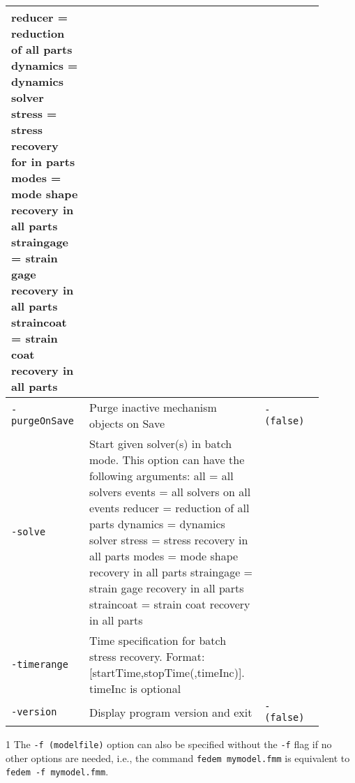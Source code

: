 \begin{threeparttable}[b]
\begin{tabular}{|>{\raggedright} p{0.23\linewidth}| p{0.48\linewidth}| p{0.18\linewidth}|}
                              reducer = reduction of all parts\newline
                              dynamics = dynamics solver\newline
                              stress = stress recovery for in parts\newline
                              modes = mode shape recovery in all parts\newline
                              straingage = strain gage recovery in all parts\newline
                              straincoat = strain coat recovery in all parts   & \\
  \hline
  \texttt{-purgeOnSave}  &   Purge inactive mechanism objects on Save & \texttt{- (false)} \\
  \hline
  \texttt{-solve}  &   Start given solver(s) in batch mode. This option can have the following arguments:\newline
                       all = all solvers\newline
                       events = all solvers on all events\newline
                       reducer = reduction of all parts\newline
                       dynamics = dynamics solver\newline
                       stress = stress recovery in all parts\newline
                       modes = mode shape recovery in all parts\newline
                       straingage = strain gage recovery in all parts\newline
                       straincoat = strain coat recovery in all parts    & \\
  \hline
  \texttt{-timerange}  &  Time specification for batch stress recovery.
                          Format: [startTime,stopTime(,timeInc)].\newline
                          timeInc is optional            &  \\
  \hline
  \texttt{-version} &  Display program version and exit  &   \texttt{- (false)} \\
  \hline
\end{tabular}
  \vspace{0.3cm}
  \begin{tablenotes}
    \item[1]
      The {\tt-f (modelfile)} option can also be specified without the {\tt-f}
      flag if no other options are needed, i.e., the command
      {\tt fedem mymodel.fmm} is equivalent to {\tt fedem -f mymodel.fmm}.
  \end{tablenotes}
\end{threeparttable}


